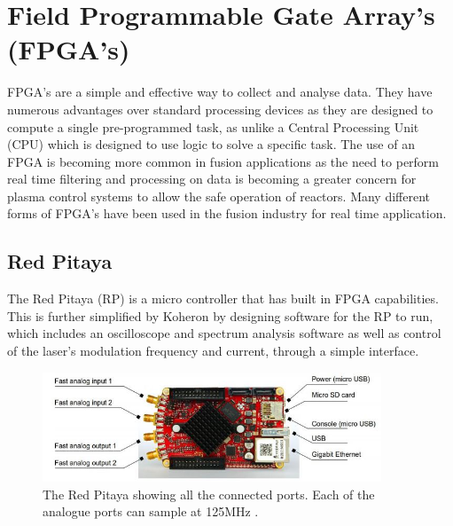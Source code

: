 \documentclass[12pt,a4paper,oneside]{report}
\begin{document}
	\section{Field Programmable Gate Array's (FPGA's)}
FPGA's are a simple and effective way to collect and analyse data. They have numerous advantages over standard processing devices as they are designed to compute a single pre-programmed task, as unlike a Central Processing Unit (CPU) which is designed to use logic to solve a specific task. The use of an FPGA is becoming more common in fusion applications as the need to perform real time filtering \cite{Naylor2010AnMAST} and processing on data is becoming a greater concern for plasma control systems to allow the safe operation of reactors. Many different forms of FPGA's have been used in the fusion industry for real time application.
	\subsection{Red Pitaya}
    
The Red Pitaya (RP) \cite{Leban2014RedManual} is a micro controller that has built in FPGA capabilities. This is further simplified by Koheron by designing software for the RP to run, which includes an oscilloscope and spectrum analysis software as well as control of the laser's modulation frequency and current, through a simple interface.


\begin{figure}[H]
\includegraphics[width=0.9\textwidth, center,angle=0]{Images/RP.JPG}
\caption{The Red Pitaya showing all the connected ports. Each of the analogue ports can sample at 125MHz \cite[p.~7]{Leban2014RedManual}.}
\label{RP}
\end{figure}
\end{document}
